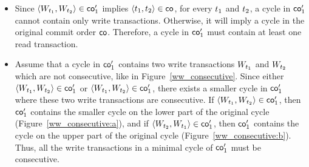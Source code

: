  \begin{itemize}
  \item Since ${\left\langle{W_{{t}_1}, W_{{t}_2}}\right\rangle} \in \mathsf{co}'_1$ implies ${\left\langle{{t}_1, {t}_2}\right\rangle} \in \mathsf{co}$, for every ${t}_1$ and ${t}_2$, a cycle in $\mathsf{co}'_1$ cannot contain only write transactions. Otherwise, it will imply a cycle in the original commit order $\mathsf{co}$. Therefore, a cycle in $\mathsf{co}'_1$ must contain at least one read transaction. 
  \item Assume that a cycle in $\mathsf{co}'_1$ contains two write transactions $W_{{t}_1}$ and $W_{{t}_2}$ which are not consecutive, like in Figure~\ref{ww_consecutive}.
Since either ${\left\langle{W_{{t}_1}, W_{{t}_2}}\right\rangle}\in \mathsf{co}'_1$ or ${\left\langle{W_{{t}_1}, W_{{t}_2}}\right\rangle}\in \mathsf{co}'_1$, there exists a smaller cycle in $\mathsf{co}'_1$ where these two write transactions are consecutive. If ${\left\langle{W_{{t}_1}, W_{{t}_2}}\right\rangle}\in \mathsf{co}'_1$, then $\mathsf{co}'_1$ contains the smaller cycle on the lower part of the original cycle (Figure~\ref{ww_consecutive:a}), and if ${\left\langle{W_{{t}_2}, W_{{t}_1}}\right\rangle}\in \mathsf{co}'_1$, then $\mathsf{co}'_1$ contains the cycle on the upper part of the original cycle (Figure~\ref{ww_consecutive:b}). Thus, all the write transactions in a minimal cycle of $\mathsf{co}'_1$ must be consecutive. 
\end{itemize}

